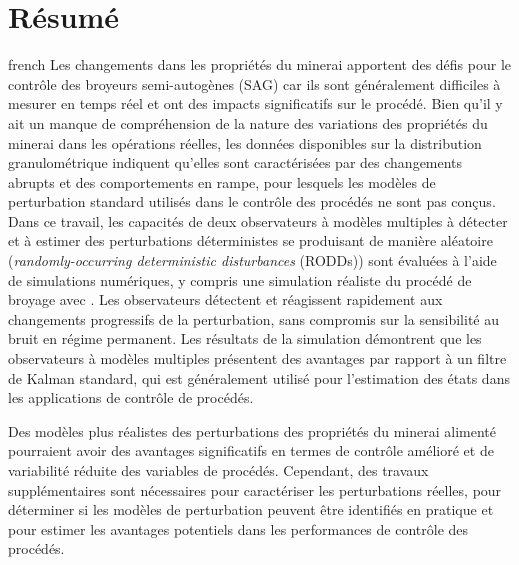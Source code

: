 \chapter*{Résumé}               %
\label{chap-resume}             %

\begin{otherlanguage*}{french}
Les changements dans les propriétés du minerai apportent des défis pour le contrôle des broyeurs semi-autogènes (SAG) car ils sont généralement difficiles à mesurer en temps réel et ont des impacts significatifs sur le procédé. Bien qu'il y ait un manque de compréhension de la nature des variations des propriétés du minerai dans les opérations réelles, les données disponibles sur la distribution granulométrique indiquent qu'elles sont caractérisées par des changements abrupts et des comportements en rampe, pour lesquels les modèles de perturbation standard utilisés dans le contrôle des procédés ne sont pas conçus. Dans ce travail, les capacités de deux observateurs à modèles multiples à détecter et à estimer des perturbations déterministes  se produisant de manière aléatoire (\textit{randomly-occurring deterministic disturbances} (\acrshort{RODD}s)) sont évaluées à l'aide de simulations numériques, y compris une simulation réaliste du procédé de broyage avec . Les observateurs détectent et réagissent rapidement aux changements progressifs de la perturbation, sans compromis sur la sensibilité au bruit en régime permanent. Les résultats de la simulation démontrent que les observateurs à modèles multiples présentent des avantages par rapport à un filtre de Kalman standard, qui est généralement utilisé pour l'estimation des états dans les applications de contrôle de procédés.

Des modèles plus réalistes des perturbations des propriétés du minerai alimenté pourraient avoir des avantages significatifs en termes de contrôle amélioré et de variabilité réduite des variables de procédés. Cependant, des travaux supplémentaires sont nécessaires pour caractériser les perturbations réelles, pour déterminer si les modèles de perturbation peuvent être identifiés en pratique et pour estimer les avantages potentiels dans les performances de contrôle des procédés.
	

\end{otherlanguage*}
